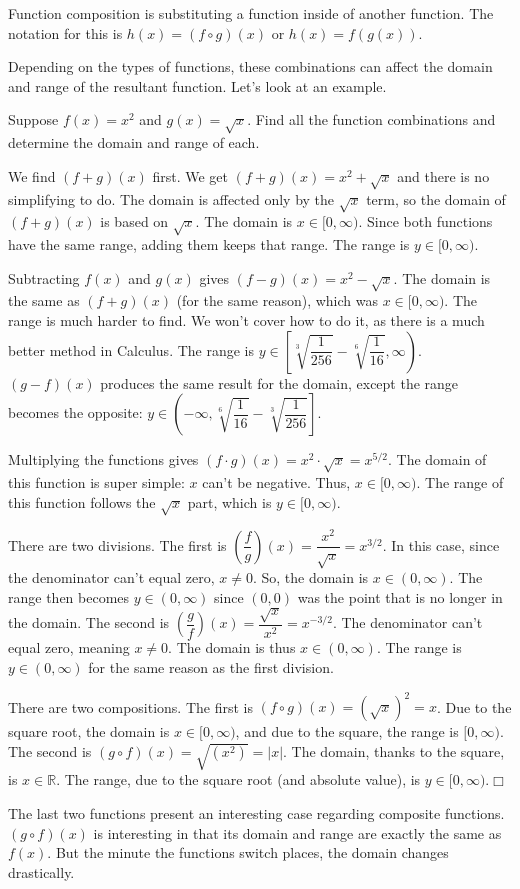 \documentclass[../book.tex]{subfiles}
\begin{document}
Function composition is substituting a function inside of another function.  The notation for this is $h(x)=(f\circ g)(x)$ or $h(x)=f\left(g(x)\right)$.

Depending on the types of functions, these combinations can affect the domain and range of the resultant function.  Let's look at an example.
\begin{example}
Suppose $f(x)=x^2$ and $g(x)=\sqrt{x}$.  Find all the function combinations and determine the domain and range of each.
\end{example}
\begin{solution}
We find $(f+g)(x)$ first.  We get $(f+g)(x)=x^2+\sqrt{x}$ and there is no simplifying to do.  The domain is affected only by the $\sqrt{x}$ term, so the domain of $(f+g)(x)$ is based on $\sqrt{x}$.  The domain is $x\in[0,\infty)$.  Since both functions have the same range, adding them keeps that range.  The range is $y\in[0,\infty)$.

Subtracting $f(x)$ and $g(x)$ gives $(f-g)(x)=x^2-\sqrt{x}$.  The domain is the same as $(f+g)(x)$ (for the same reason), which was $x\in[0,\infty)$.  The range is much harder to find.  We won't cover how to do it, as there is a much better method in Calculus.  The range is $y\in\left[\sqrt[3]{\dfrac{1}{256}}-\sqrt[6]{\dfrac{1}{16}},\infty\right)$.  $(g-f)(x)$ produces the same result for the domain, except the range becomes the opposite: $y\in\left(-\infty,\sqrt[6]{\dfrac{1}{16}}-\sqrt[3]{\dfrac{1}{256}}\right]$.

Multiplying the functions gives $(f\cdot g)(x)=x^2\cdot \sqrt{x}=x^{5/2}$.  The domain of this function is super simple: $x$ can't be negative.  Thus, $x\in[0,\infty)$.  The range of this function follows the $\sqrt{x}$ part, which is $y\in[0,\infty)$.

There are two divisions.  The first is $\left(\dfrac{f}{g}\right)(x)=\dfrac{x^2}{\sqrt{x}}=x^{3/2}$.  In this case, since the denominator can't equal zero, $x\neq 0$.  So, the domain is $x\in(0,\infty)$.  The range then becomes $y\in(0,\infty)$ since $(0,0)$ was the point that is no longer in the domain.  The second is $\left(\dfrac{g}{f}\right)(x)=\dfrac{\sqrt{x}}{x^2}=x^{-3/2}$.  The denominator can't equal zero, meaning $x\neq 0$.  The domain is thus $x\in(0,\infty)$.  The range is $y\in(0,\infty)$ for the same reason as the first division.  

There are two compositions.  The first is $(f\circ g)(x)=\left(\sqrt{x}\right)^2=x$.  Due to the square root, the domain is $x\in[0,\infty)$, and due to the square, the range is $[0,\infty)$.  The second is $(g\circ f)(x)=\sqrt{\left(x^2\right)}=|x|$.  The domain, thanks to the square, is $x\in\mathbb{R}$.  The range, due to the square root (and absolute value), is $y\in[0,\infty)$.$\Box$
\end{solution}
The last two functions present an interesting case regarding composite functions.  $(g\circ f)(x)$ is interesting in that its domain and range are exactly the same as $f(x)$.  But the minute the functions switch places, the domain changes drastically.  
\end{document}
